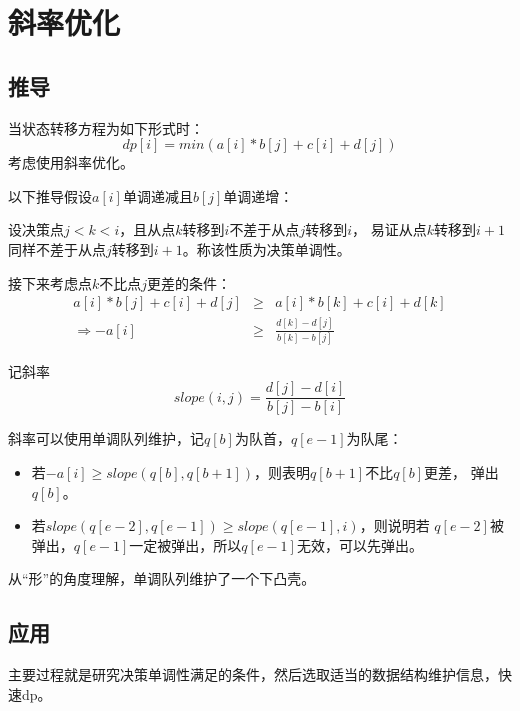 \section{斜率优化}\label{Slope}
\subsection{推导}
当状态转移方程为如下形式时：
\begin{displaymath}
    dp[i]=min(a[i]*b[j]+c[i]+d[j])
\end{displaymath}
考虑使用斜率优化。

以下推导假设$a[i]$单调递减且$b[j]$单调递增：

设决策点$j<k<i$，且从点$k$转移到$i$不差于从点$j$转移到$i$，
易证从点$k$转移到$i+1$同样不差于从点$j$转移到$i+1$。称该性质为决策单调性。

接下来考虑点$k$不比点$j$更差的条件：
\begin{eqnarray*}
    a[i]*b[j]+c[i]+d[j]&\geq&a[i]*b[k]+c[i]+d[k]\\
    \Rightarrow -a[i]&\geq&\frac{d[k]-d[j]}{b[k]-b[j]}
\end{eqnarray*}

记斜率
\begin{displaymath}
    slope(i,j)=\frac{d[j]-d[i]}{b[j]-b[i]}
\end{displaymath}

斜率可以使用单调队列维护，记$q[b]$为队首，$q[e-1]$为队尾：
\begin{itemize}
    \item 若$-a[i]\geq slope(q[b],q[b+1])$，则表明$q[b+1]$不比$q[b]$更差，
    弹出$q[b]$。
    \item 若$slope(q[e-2],q[e-1])\geq slope(q[e-1],i)$，则说明若
    $q[e-2]$被弹出，$q[e-1]$一定被弹出，所以$q[e-1]$无效，可以先弹出。
\end{itemize}

从``形''的角度理解，单调队列维护了一个下凸壳。
\subsection{应用}
主要过程就是研究决策单调性满足的条件，然后选取适当的数据结构维护信息，快速dp。

